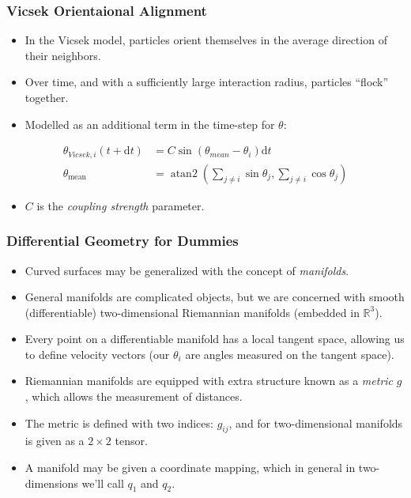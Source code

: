 \documentclass{beamer}
\newcommand{\dt}{\text{d}t}
\begin{document}
\begin{frame}
    \frametitle{Vicsek Orientaional Alignment}

    \begin{itemize}
        \item In the Vicsek model, particles orient themselves in the average direction of their neighbors.
        \item Over time, and with a sufficiently large interaction radius, particles ``flock'' together.
        \item Modelled as an additional term in the time-step for $\theta$:
    \end{itemize}
    \begin{align*}
        \theta_{Vicsek,i}(t + \dt)
        &= C \sin(\theta_{mean} - \theta_i) \dt \\
        \theta_\text{mean} &= \operatorname{atan2}\left(
            \sum_{j\neq i}\sin\theta_j,
            \sum_{j\neq i}\cos\theta_j
        \right)
    \end{align*}
    \begin{itemize}
        \item \textcolor{MainPurple}{$C$} is the \emph{coupling strength} parameter.
    \end{itemize}
\end{frame}

\begin{frame}
    \frametitle{Differential Geometry for Dummies}

    \begin{itemize}
        \item Curved surfaces may be generalized with the concept of \emph{manifolds}.
        \item General manifolds are complicated objects, but we are concerned with smooth
        (differentiable) two-dimensional Riemannian manifolds (embedded in $\mathbb{R}^3$).
        \item Every point on a differentiable manifold has a local tangent space,
        allowing us to define velocity vectors (our $\theta_i$ are angles
        measured on the tangent space).
        \item Riemannian manifolds are equipped with extra structure known as
        a \emph{metric} $g$, which allows the measurement of distances.
        \item The metric is defined with two indices: $g_{ij}$, and for two-dimensional
        manifolds is given as a $2\times2$ tensor.
        \item A manifold may be given a coordinate mapping, which in
        general in two-dimensions we'll call $q_1$ and $q_2$.
    \end{itemize}
\end{frame}
\end{document}
